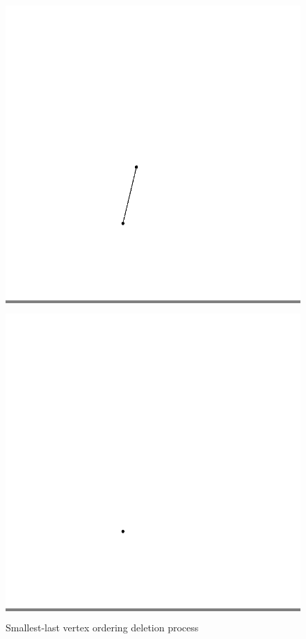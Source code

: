 \documentclass{article}
\begin{document}
\begin{figure}
\begin{minipage}{0.2\textwidth}
            \end{minipage}
            \hspace{\fill}
            \begin{minipage}{0.2\textwidth}
            \colorbox{gray}{\includegraphics[width=\linewidth]{./images/slvo-18.png}}
            \end{minipage}
            \hspace{\fill}
            \begin{minipage}{0.2\textwidth}
            \colorbox{gray}{\includegraphics[width=\linewidth]{./images/slvo-19.png}}
            \end{minipage}

            \caption{Smallest-last vertex ordering deletion process}
            \label{slvodel}
        \end{figure}
\end{document}
